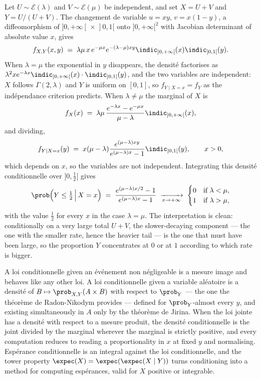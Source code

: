 \begin{example}
  Let $U \sim \mathcal{E}(\lambda)$ and $V \sim \mathcal{E}(\mu)$ be independent,
  and set $X = U + V$ and $Y = U/(U+V)$. The changement de
  variable $u = xy$, $v = x(1-y)$, a diffeomorphism of
  $]0,+\infty[ \, \times \, ]0,1[$ onto $]0,+\infty[^{2}$ with Jacobian
  determinant of absolute value $x$, gives
  \[
    f_{X,Y}(x,y) \;=\; \lambda \mu \, x \, e^{-\mu x} e^{-(\lambda - \mu) x y}
      \indic_{]0,+\infty[}(x) \indic_{]0,1[}(y) .
  \]
  When $\lambda = \mu$ the exponential in $y$ disappears, the densité factorises
  as $\lambda^{2} x e^{-\lambda x} \indic_{]0,+\infty[}(x) \cdot \indic_{]0,1[}(y)$,
  and the two variables are independent: $X$ follows $\Gamma(2,\lambda)$ and $Y$
  is uniform on $[0,1]$, so $f_{Y \mid X = x} = f_{Y}$ as the indépendance
  criterion predicts. When $\lambda \neq \mu$ the marginal of $X$ is
  \[
    f_{X}(x) \;=\; \lambda \mu \, \frac{e^{-\lambda x} - e^{-\mu x}}{\mu - \lambda} \indic_{]0,+\infty[}(x) ,
  \]
  and dividing,
  \[
    f_{Y \mid X = x}(y) \;=\; x (\mu - \lambda) \frac{e^{(\mu - \lambda) x y}}{e^{(\mu - \lambda) x} - 1} \indic_{]0,1[}(y) ,
    \qquad x > 0 ,
  \]
  which depends on $x$, so the variables are not independent. Integrating this
  densité conditionnelle over $]0,\tfrac{1}{2}[$ gives
  \[
    \prob\!\left( Y \leq \tfrac{1}{2} \,\Big|\, X = x \right)
    \;=\; \frac{e^{(\mu - \lambda) x / 2} - 1}{e^{(\mu - \lambda) x} - 1}
    \;\xrightarrow[x \to +\infty]{}\;
    \begin{cases}
      0 & \text{if } \lambda < \mu, \\
      1 & \text{if } \lambda > \mu,
    \end{cases}
  \]
  with the value $\tfrac{1}{2}$ for every $x$ in the case $\lambda = \mu$. The
  interpretation is clean: conditionally on a very large total $U + V$, the
  slower-decaying component --- the one with the smaller rate, hence the heavier
  tail --- is the one that must have been large, so the proportion $Y$
  concentrates at $0$ or at $1$ according to which rate is bigger.
\end{example}

\begin{conclusion}
  A loi conditionnelle given an événement non négligeable is a mesure image and
  behaves like any other loi. A loi conditionnelle given a variable aléatoire is a
  densité of $B \mapsto \prob_{X,Y}(A \times B)$ with respect to
  $\prob_{Y}$ --- the one the théorème de Radon-Nikodym provides --- defined for
  $\prob_{Y}$-almost every $y$, and existing simultaneously in $A$ only by the
  théorème de Jirina. When the loi jointe has a densité with respect to a mesure
  produit, the densité conditionnelle is the joint divided by the marginal wherever
  the marginal is strictly positive, and every computation reduces to reading a
  proportionality in $x$ at fixed $y$ and normalising. Espérance conditionnelle is an
  integral against the loi conditionnelle, and the tower property
  $\expec(X) = \expec(\expec(X \mid Y))$ turns conditioning into a method for
  computing espérances, valid for $X$ positive or integrable.
\end{conclusion}
